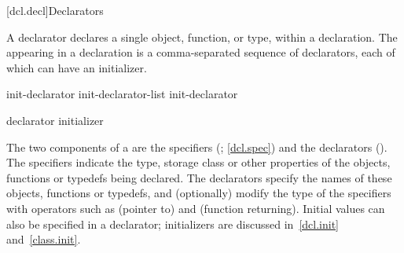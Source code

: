 [dcl.decl]{Declarators}%


%
%
%
%
%

\pnum
A declarator declares a single object, function, or type, within a declaration.
The
appearing in a declaration
is a comma-separated sequence of declarators,
each of which can have an initializer.

\begin{bnf}
\br
    init-declarator\br
    init-declarator-list \terminal{,} init-declarator
\end{bnf}

\begin{bnf}
\br
    declarator initializer\opt
\end{bnf}

\pnum
The two components of a  are the
specifiers (;
\ref{dcl.spec}) and the declarators ().
The specifiers indicate the type, storage class or other properties of
the objects, functions or typedefs being declared.
The declarators specify the names of these objects, functions or typedefs,
and (optionally) modify the type of the specifiers with operators such as
\tcode{*}
(pointer
to)
and
\tcode{()}
(function returning).
Initial values can also be specified in a declarator;
initializers are discussed in~\ref{dcl.init} and~\ref{class.init}.

